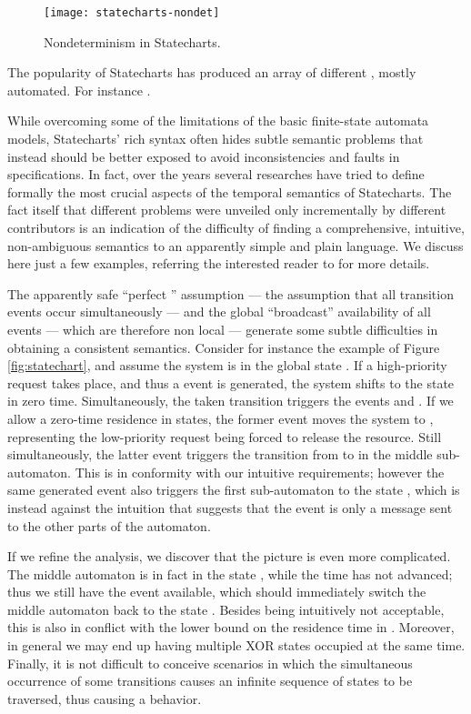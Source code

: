 \begin{figure}[htb!]
	 \centering
	 \texttt{[image: statecharts-nondet]}
	 \caption{Nondeterminism in Statecharts.}
	 \label{fig:statecharts-nondet}
\end{figure}

The popularity of Statecharts has produced an array of different 
, mostly automated. For instance \cite{HLNPPSST90,BDW00,GTBF03}.

While overcoming some of the limitations of the basic finite-state 
automata models, Statecharts' rich syntax often hides subtle semantic 
problems that instead should be better exposed to avoid inconsistencies 
and faults in specifications. In fact, over the years several 
researches have tried to define formally the most crucial aspects 
of the temporal semantics of Statecharts. The fact itself that 
different problems were unveiled only incrementally by different 
contributors is an indication of the difficulty of finding a 
comprehensive, intuitive, non-ambiguous semantics to an apparently 
simple and plain language. We discuss here just a few examples, 
referring the interested reader to \cite{HPSS87,PS91,vdB94,HN96} 
for more details.

The apparently safe ``perfect '' assumption --- the assumption 
that all transition events occur simultaneously --- and the global 
``broadcast'' availability of all events --- which are therefore 
non local --- generate some subtle difficulties in obtaining a 
consistent semantics. Consider for instance the example of Figure \ref{fig:statechart}, 
and assume the system is in the global state . 
If a high-priority request takes place, and thus a  event 
is generated, the system shifts to the state  in zero time.
Simultaneously, the taken transition triggers the events  and .
If we allow a zero-time residence in states, the former event moves the system
to , representing the low-priority request being forced to release 
the resource. Still simultaneously, the latter  event 
triggers the transition from  to  in the middle sub-automaton.
This is in conformity with our intuitive requirements; however the same  generated event also triggers 
the first sub-automaton to the state , which is instead 
against the intuition that suggests that the event is only a 
message sent to the other parts of the automaton.

If we refine the analysis, we discover that the picture is even 
more complicated. The middle automaton is in fact in the state , 
while the time has not advanced; thus we still have the  
event available, which should immediately switch the middle automaton 
back to the state . Besides being intuitively not 
acceptable, this is also in conflict with the lower bound on 
the residence time in . Moreover, in general we may end 
up having multiple XOR states occupied at the same time. Finally, 
it is not difficult to conceive scenarios in which the simultaneous 
occurrence of some transitions causes an infinite sequence of 
states to be traversed, thus causing a  behavior.

